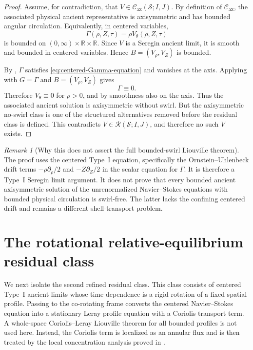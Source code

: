 \documentclass[11pt]{amsart}
\numberwithin{equation}{section}
\theoremstyle{plain}
\theoremstyle{definition}
\theoremstyle{remark}
\newtheorem{remark}[theorem]{Remark}
\newcommand{\Cax}{\mathcal C_{\mathrm{ax}}}
\begin{document}
\begin{proof}
Assume, for contradiction, that
\(V\in\Cax(\mathcal S;I,J)\).  By definition of \(\Cax\), the
associated physical ancient representative is axisymmetric and has bounded
angular circulation.  Equivalently, in centered variables,
\[
   \Gamma(\rho,Z,\tau)=\rho V_\theta(\rho,Z,\tau)
\]
is bounded on \((0,\infty)\times\mathbb R\times\mathbb R\).  Since \(V\) is a
Seregin ancient limit, it is smooth and bounded in centered variables.  Hence
\(B=(V_\rho,V_Z)\) is bounded.

By , \(\Gamma\) satisfies
\eqref{eq:centered-Gamma-equation} and vanishes at the axis.  Applying
 with \(G=\Gamma\) and
\(B=(V_\rho,V_Z)\) gives
\[
   \Gamma\equiv0 .
\]
Therefore \(V_\theta\equiv0\) for \(\rho>0\), and by smoothness also on the
axis.  Thus the associated ancient solution is axisymmetric without swirl.
But the axisymmetric no-swirl class is one of the structured alternatives
removed before the residual class is defined.  This contradicts
\(V\in\mathcal R(\mathcal S;I,J)\), and therefore no such \(V\) exists.
\end{proof}

\begin{remark}[Why this does not assert the full bounded-swirl Liouville theorem]
The proof uses the centered Type~I equation, specifically the
Ornstein--Uhlenbeck drift terms \(-\rho\partial_\rho/2\) and
\(-Z\partial_Z/2\) in the scalar equation for \(\Gamma\).  It is therefore a
Type~I Seregin limit argument.  It does not prove that every bounded ancient
axisymmetric solution of the unrenormalized Navier--Stokes equations with
bounded physical circulation is swirl-free.  The latter lacks the confining
centered drift and remains a different shell-transport problem.
\end{remark}


\section{The rotational relative-equilibrium residual class}
\label{sec:R2-reduction}

We next isolate the second refined residual class.  This class consists of
centered Type~I ancient limits whose time dependence is a rigid rotation of a
fixed spatial profile.  Passing to the co-rotating frame converts the centered
Navier--Stokes equation into a stationary Leray profile equation with a
Coriolis transport term.  A whole-space Coriolis--Leray Liouville theorem for
all bounded profiles is not used here.  Instead, the Coriolis term is localized as an annular
flux and is then treated by the local concentration analysis proved in
.
\end{document}
